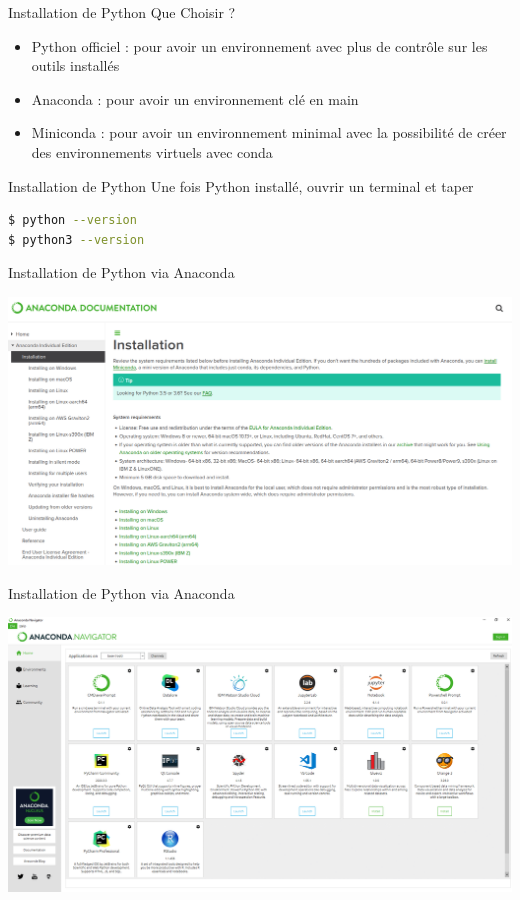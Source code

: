 \begin{frame}[fragile]{Installation de Python}
  Que Choisir ?
  \begin{itemize}
    \item Python officiel : pour avoir un environnement avec plus de contrôle sur les outils installés
    \item Anaconda : pour avoir un environnement clé en main
    \item Miniconda : pour avoir un environnement minimal avec la possibilité de créer des environnements virtuels avec conda
  \end{itemize}
\end{frame}

\begin{frame}[fragile]{Installation de Python}
  Une fois Python installé, ouvrir un terminal et taper
\begin{lstlisting}[language=bash, morekeywords=\$, numbers=none]
$ python --version
$ python3 --version
\end{lstlisting}
\end{frame}


\begin{frame}{Installation de Python via Anaconda}

  \begin{center}
   \includegraphics[width=\textwidth]{img/anaconda.png}
  \end{center}
   
\end{frame}
 
 
\begin{frame}{Installation de Python via Anaconda}
  \begin{center}
    \includegraphics[width=\textwidth]{img/anaconda_navigator.png}
  \end{center}
\end{frame}


